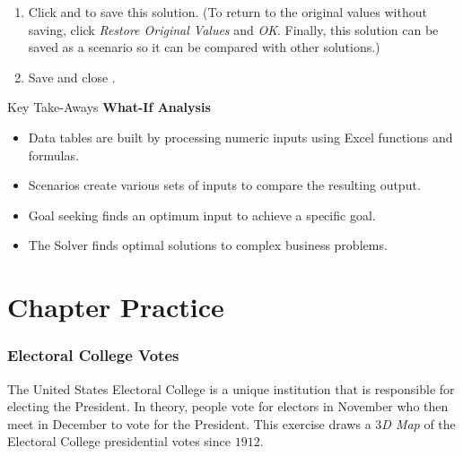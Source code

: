 \begin{enumerate}[resume]
	\item Click  and  to save this solution. (To return to the original values without saving, click \textit{Restore Original Values} and \textit{OK}. Finally, this solution can be saved as a scenario so it can be compared with other solutions.)
	\item Save and close .
\end{enumerate}

\begin{center}
	\begin{tkwbox}{Key Take-Aways}
		\textbf{What-If Analysis}
		\\
		\begin{itemize}
			\setlength{\itemsep}{0pt}
			\setlength{\parskip}{0pt}
			\setlength{\parsep}{0pt}
			
			\item Data tables are built by processing numeric inputs using Excel functions and formulas.
			\item Scenarios create various sets of inputs to compare the resulting output.
			\item Goal seeking finds an optimum input to achieve a specific goal.
			\item The Solver finds optimal solutions to complex business problems.
			
		\end{itemize}
	\end{tkwbox}
\end{center}

\section{Chapter Practice}

\subsubsection{Electoral College Votes}

The United States Electoral College is a unique institution that is responsible for electing the President. In theory, people vote for electors in November who then meet in December to vote for the President. This exercise draws a \textit{$ 3 $D Map} of the Electoral College presidential votes since $ 1912 $.

